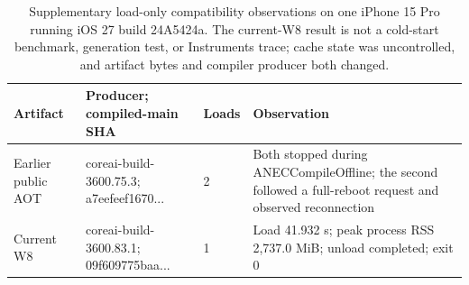 \begin{table}[H]
\centering
\small
\setlength{\tabcolsep}{4pt}
\begin{tabularx}{\textwidth}{@{}p{}p{}p{}X@{}}
\toprule
Artifact & Producer; compiled-main SHA & Loads & Observation \\
\midrule
Earlier public AOT & coreai-build-3600.75.3; a7eefeef1670... & 2 & Both stopped during ANECCompileOffline; the second followed a full-reboot request and observed reconnection \\
Current W8 & coreai-build-3600.83.1; 09f609775baa... & 1 & Load 41.932 s; peak process RSS 2,737.0 MiB; unload completed; exit 0 \\
\bottomrule
\end{tabularx}
\caption{Supplementary load-only compatibility observations on one iPhone 15 Pro running iOS 27 build 24A5424a. The current-W8 result is not a cold-start benchmark, generation test, or Instruments trace; cache state was uncontrolled, and artifact bytes and compiler producer both changed. }
\label{tab:w8-compatibility}
\end{table}
